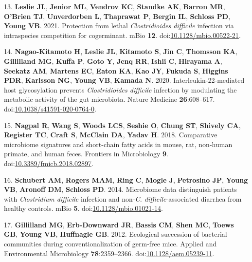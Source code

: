 \documentclass[
  12pt,
]{article}
\newenvironment{cslreferences}%
  {}%
  {\par}
\begin{document}
\begin{cslreferences}
\leavevmode\hypertarget{ref-Leslie2021}{}%
13. \textbf{Leslie JL}, \textbf{Jenior ML}, \textbf{Vendrov KC},
\textbf{Standke AK}, \textbf{Barron MR}, \textbf{O'Brien TJ},
\textbf{Unverdorben L}, \textbf{Thaprawat P}, \textbf{Bergin IL},
\textbf{Schloss PD}, \textbf{Young VB}. 2021. Protection from lethal
\emph{Clostridioides difficile} infection via intraspecies competition
for cogerminant. mBio \textbf{12}.
doi:\href{https://doi.org/10.1128/mbio.00522-21}{10.1128/mbio.00522-21}.

\leavevmode\hypertarget{ref-NagaoKitamoto2020}{}%
14. \textbf{Nagao-Kitamoto H}, \textbf{Leslie JL}, \textbf{Kitamoto S},
\textbf{Jin C}, \textbf{Thomsson KA}, \textbf{Gillilland MG},
\textbf{Kuffa P}, \textbf{Goto Y}, \textbf{Jenq RR}, \textbf{Ishii C},
\textbf{Hirayama A}, \textbf{Seekatz AM}, \textbf{Martens EC},
\textbf{Eaton KA}, \textbf{Kao JY}, \textbf{Fukuda S}, \textbf{Higgins
PDR}, \textbf{Karlsson NG}, \textbf{Young VB}, \textbf{Kamada N}. 2020.
Interleukin-22-mediated host glycosylation prevents \emph{Clostridioides
difficile} infection by modulating the metabolic activity of the gut
microbiota. Nature Medicine \textbf{26}:608--617.
doi:\href{https://doi.org/10.1038/s41591-020-0764-0}{10.1038/s41591-020-0764-0}.

\leavevmode\hypertarget{ref-Nagpal2018}{}%
15. \textbf{Nagpal R}, \textbf{Wang S}, \textbf{Woods LCS},
\textbf{Seshie O}, \textbf{Chung ST}, \textbf{Shively CA},
\textbf{Register TC}, \textbf{Craft S}, \textbf{McClain DA},
\textbf{Yadav H}. 2018. Comparative microbiome signatures and
short-chain fatty acids in mouse, rat, non-human primate, and human
feces. Frontiers in Microbiology \textbf{9}.
doi:\href{https://doi.org/10.3389/fmicb.2018.02897}{10.3389/fmicb.2018.02897}.

\leavevmode\hypertarget{ref-Schubert2014}{}%
16. \textbf{Schubert AM}, \textbf{Rogers MAM}, \textbf{Ring C},
\textbf{Mogle J}, \textbf{Petrosino JP}, \textbf{Young VB},
\textbf{Aronoff DM}, \textbf{Schloss PD}. 2014. Microbiome data
distinguish patients with \emph{Clostridium difficile} infection and
non-\emph{C. difficile}-associated diarrhea from healthy controls. mBio
\textbf{5}.
doi:\href{https://doi.org/10.1128/mbio.01021-14}{10.1128/mbio.01021-14}.

\leavevmode\hypertarget{ref-Gillilland2012}{}%
17. \textbf{Gillilland MG}, \textbf{Erb-Downward JR}, \textbf{Bassis
CM}, \textbf{Shen MC}, \textbf{Toews GB}, \textbf{Young VB},
\textbf{Huffnagle GB}. 2012. Ecological succession of bacterial
communities during conventionalization of germ-free mice. Applied and
Environmental Microbiology \textbf{78}:2359--2366.
doi:\href{https://doi.org/10.1128/aem.05239-11}{10.1128/aem.05239-11}.


\end{cslreferences}
\end{document}
